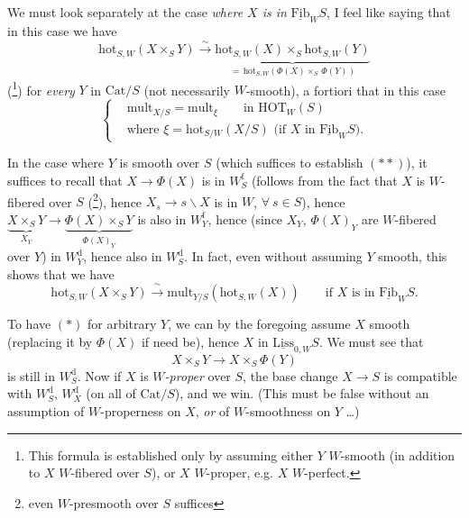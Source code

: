 \documentclass[11pt]{article}
\newcommand{\printedpage}[1]{\marginpar{\footnotesize p.~#1}}
\newcommand{\msp}[1]{\marginpar{\footnotesize [#1]}}
\begin{document}
We must look separately at the case \textit{where $X$ is in} $\underline{\mathrm{Fib}}_W S$, I feel like saying that in this case we have
\[
\mathrm{hot}_{S,W}(X\times_S Y) \xrightarrow{\ \sim\ } \underbrace{\mathrm{hot}_{S,W}(X)\times_S \mathrm{hot}_{S,W}(Y)}_{=\,\mathrm{hot}_{S,W}(\Phi(X)\times_S\, \Phi(Y))} \tag*{$(*)$} %
\]
(\footnote{This formula is established only by assuming either $Y$ $W$-smooth (in addition to $X$ $W$-fibered over $S$), or $X$ $W$-proper, e.g. $X$ $W$-perfect.}) for \textit{every} $Y$ in $\mathrm{Cat}/S$ (not necessarily $W$-smooth), a fortiori that in this case
\[
\left\{\begin{aligned}
&\mathrm{mult}_{X/S} = \mathrm{mult}_\xi \qquad \text{in } \mathrm{HOT}_W(S)\\
&\text{where } \xi = \mathrm{hot}_{S/W}(X/S) \text{ (if $X$ in $\underline{\mathrm{Fib}}_W S$).} %
\end{aligned}\right. \tag*{$(**)$}
\]

\printedpage{125}

In the case where $Y$ is smooth over $S$ (which suffices to establish $(**)$), it suffices to recall that $X\longrightarrow \Phi(X)$ is in $W_S^{\mathrm{f}}$ (follows from the fact that $X$ is $W$-fibered over $S$ (\footnote{even $W$-presmooth over $S$ suffices}), hence $X_s \longrightarrow s\backslash X$ is in $W$, $\forall\ s\in S$), hence $\underbrace{X\times_S Y}_{X_Y} \longrightarrow \underbrace{\Phi(X)\times_S Y}_{\Phi(X)_Y}$ is also in $W_Y^{\mathrm{f}}$, hence (since $X_Y$, $\Phi(X)_Y$ are $W$-fibered over $Y$) in $W_Y^{\mathrm{d}}$, hence also in $W_S^{\mathrm{d}}$. In fact, even without assuming $Y$ smooth, this shows that we have
\msp{page 202}
\[
\mathrm{hot}_{S,W}(X\times_S Y) \xrightarrow{\ \sim\ } \mathrm{mult}_{Y/S}(\mathrm{hot}_{S,W}(X)) \qquad \text{if $X$ is in $\underline{\mathrm{Fib}}_W S$.} \tag*{$(*)$}
\]

To have $(*)$ for arbitrary $Y$, we can by the foregoing assume $X$ smooth (replacing it by $\Phi(X)$ if need be), hence $X$ in $\underline{\mathrm{Liss}}_{0,W}S$. We must see that
\[
X\times_S Y \longrightarrow X\times_S \Phi(Y)
\]
is still in $W_S^{\mathrm{d}}$. Now if $X$ is \textit{$W$-proper} over $S$, the base change $X\longrightarrow S$ is compatible with $W_S^{\mathrm{d}}$, $W_X^{\mathrm{d}}$ (on all of $\mathrm{Cat}/S$), and we win. (This must be false without an assumption of $W$-properness on $X$, \textit{or} of $W$-smoothness on $Y$ \dots)
\end{document}
